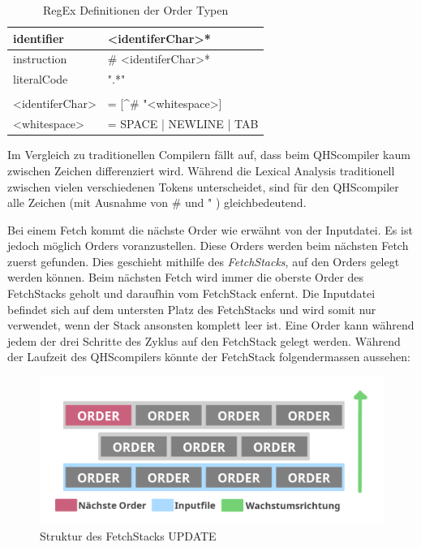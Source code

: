 \begin{table}[h]
    \centering
    \caption{RegEx Definitionen der Order Typen}
    \vspace{3mm} %
    
    \begin{tabular}{ll}
    \multicolumn{1}{l|}{identifier}        & \textless{}identiferChar\textgreater{}*                           \\ \hline
    \multicolumn{1}{l|}{instruction}       & \# \textless{}identiferChar\textgreater{}*                        \\ \hline
    \multicolumn{1}{l|}{literalCode}       & ".*"                                                              \\
                                           &                                                                   \\
    \textless{}identiferChar\textgreater{} & = {[}\textasciicircum{}\# "\textless{}whitespace\textgreater{}{]} \\
    \textless{}whitespace\textgreater{}    & = SPACE | NEWLINE | TAB
    
    \end{tabular}
\end{table}

Im Vergleich zu traditionellen Compilern fällt auf, dass beim QHScompiler kaum zwischen Zeichen differenziert wird. Während die Lexical Analysis traditionell zwischen vielen verschiedenen Tokens unterscheidet,
sind für den QHScompiler alle Zeichen (mit Ausnahme von \# und " ) gleichbedeutend.

Bei einem Fetch kommt die nächste Order wie erwähnt von der Inputdatei.
Es ist jedoch möglich Orders voranzustellen. Diese Orders werden beim nächsten Fetch zuerst gefunden. Dies geschieht mithilfe des \textit{FetchStacks}, auf den Orders gelegt werden können.
Beim nächsten Fetch wird immer die oberste Order des FetchStacks geholt und daraufhin vom FetchStack enfernt.
Die Inputdatei befindet sich auf dem untersten Platz des FetchStacks und wird somit nur verwendet, wenn der Stack ansonsten komplett leer ist.
Eine Order kann während jedem der drei Schritte des Zyklus auf den FetchStack gelegt werden.
Während der Laufzeit des QHScompilers könnte der FetchStack folgendermassen aussehen:

\begin{figure}[h!]
    \centering
    \includegraphics[scale=1.1]{resources/images/fetch-stack.png}
    \caption{Struktur des FetchStacks UPDATE}
    \label{fig:fetchstack}
\end{figure}

